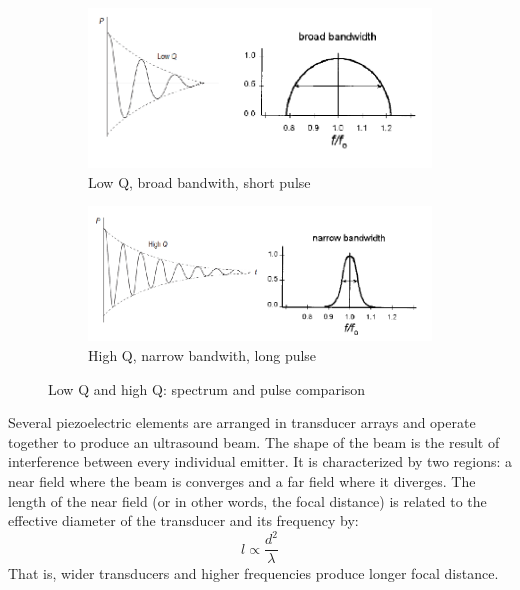 \documentclass[12pt]{article} %
\begin{document}
	\begin{figure}
	\centering
		\begin{subfigure}{0.6\textwidth}
		\centering
		\includegraphics[width=\textwidth]{figuras/lowq.png}
		\caption{Low Q, broad bandwith, short pulse}
		\end{subfigure}
		\centering
		\begin{subfigure}{0.6\textwidth}
		\centering
		\includegraphics[width=\textwidth]{figuras/highq.png}
		\caption{High Q, narrow bandwith, long pulse}
		\end{subfigure}	
	\caption{Low Q and high Q: spectrum and pulse comparison\cite{bushberg}\cite{farr}}	
	\end{figure}

	
	Several piezoelectric elements are arranged in transducer arrays and operate together to produce an ultrasound beam. The shape of the beam is the result of interference between every individual emitter. It is characterized by two regions: a near field where the beam is converges and a far field where it diverges. The length of the near field (or in other words, the focal distance) is related to the effective diameter of the transducer and its frequency by: \[ l \propto \frac{d^2}{\lambda} \] That is, wider transducers and higher frequencies produce longer focal distance.

	
\end{document}
